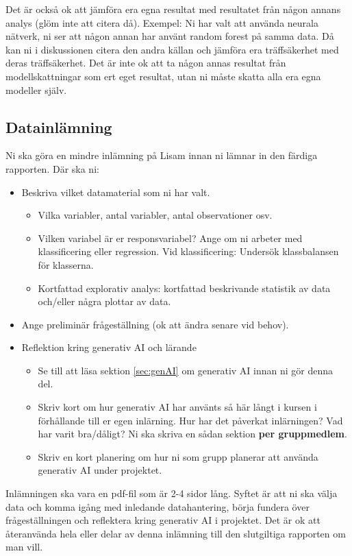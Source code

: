 \documentclass[a4paper]{article}
\begin{document}
Det är också ok att jämföra era egna resultat med resultatet från någon annans analys (glöm inte att citera då). Exempel: Ni har valt att använda neurala nätverk, ni ser att någon annan har använt random forest på samma data. Då kan ni i diskussionen citera den andra källan och jämföra era träffsäkerhet med deras träffsäkerhet. Det är inte ok att ta någon annas resultat från modellskattningar som ert eget resultat, utan ni måste skatta alla era egna modeller själv.

\subsection*{Datainlämning}
Ni ska göra en mindre inlämning på Lisam innan ni lämnar in den färdiga rapporten. Där ska ni:
\begin{itemize}
    \item Beskriva vilket datamaterial som ni har valt.
    \begin{itemize}
        \item Vilka variabler, antal variabler, antal observationer osv.
        \item Vilken variabel är er responsvariabel? Ange om ni arbeter med klassificering eller regression. Vid klassificering: Undersök klassbalansen för klasserna.
        \item Kortfattad explorativ analys: kortfattad beskrivande statistik av data och/eller några plottar av data.
    \end{itemize}
    \item Ange preliminär frågeställning (ok att ändra senare vid behov).
    \item Reflektion kring generativ AI och lärande
    \begin{itemize}
      \item Se till att läsa sektion \ref{sec:genAI} om generativ AI innan ni gör denna del.
      \item Skriv kort om hur generativ AI har använts så här långt i kursen i förhållande till er egen inlärning. 
      Hur har det påverkat inlärningen? Vad har varit bra/dåligt? Ni ska skriva en sådan sektion
      \textbf{per gruppmedlem}.
      \item Skriv en kort planering om hur ni som grupp planerar att använda generativ AI under projektet.
    \end{itemize}
\end{itemize}
Inlämningen ska vara en pdf-fil som är 2-4 sidor lång. Syftet är att ni ska välja data
och komma igång med inledande datahantering, börja fundera över frågeställningen 
och reflektera kring generativ AI i projektet.
Det är ok att återanvända hela eller delar av denna inlämning till den slutgiltiga rapporten om man vill.
\end{document}
